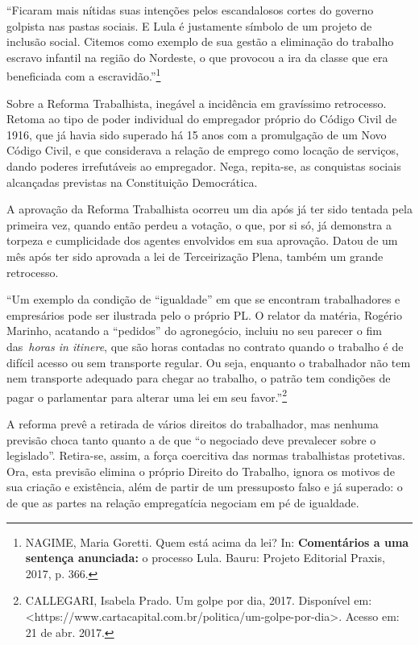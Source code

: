 ``Ficaram mais nítidas suas intenções pelos escandalosos cortes do
governo golpista nas pastas sociais. E Lula é justamente símbolo de um
projeto de inclusão social. Citemos como exemplo de sua gestão a
eliminação do trabalho escravo infantil na região do Nordeste, o que
provocou a ira da classe que era beneficiada com a
escravidão.''\footnote{NAGIME, Maria Goretti. Quem está acima da lei?
  In: \textbf{Comentários a uma sentença anunciada:} o processo Lula.
  Bauru: Projeto Editorial Praxis, 2017, p. 366.}

Sobre a Reforma Trabalhista, inegável a incidência em gravíssimo
retrocesso. Retoma ao tipo de poder individual do empregador próprio do
Código Civil de 1916, que já havia sido superado há 15 anos com a
promulgação de um Novo Código Civil, e que considerava a relação de
emprego como locação de serviços, dando poderes irrefutáveis ao
empregador. Nega, repita-se, as conquistas sociais alcançadas previstas
na Constituição Democrática.

A aprovação da Reforma Trabalhista ocorreu um dia após já ter sido
tentada pela primeira vez, quando então perdeu a votação, o que, por si
só, já demonstra a torpeza e cumplicidade dos agentes envolvidos em sua
aprovação. Datou de um mês após ter sido aprovada a lei de Terceirização
Plena, também um grande retrocesso.

``Um exemplo da condição de ``igualdade'' em que se encontram
trabalhadores e empresários pode ser ilustrada pelo o próprio PL. O
relator da matéria, Rogério Marinho, acatando a ``pedidos'' do
agronegócio, incluiu no seu parecer o fim das~\emph{horas in itinere},
que são horas contadas no contrato quando o trabalho é de difícil acesso
ou sem transporte regular. Ou seja, enquanto o trabalhador não tem nem
transporte adequado para chegar ao trabalho, o patrão tem condições de
pagar o parlamentar para alterar uma lei em seu favor.''\footnote{CALLEGARI,
  Isabela Prado. Um golpe por dia, 2017. Disponível
  em:\textless{}https://www.cartacapital.com.br/politica/um-golpe-por-dia\textgreater{}.
  Acesso em: 21 de abr. 2017.}

A reforma prevê a retirada de vários direitos do trabalhador, mas
nenhuma previsão choca tanto quanto a de que ``o negociado deve
prevalecer sobre o legislado''. Retira-se, assim, a força coercitiva das
normas trabalhistas protetivas. Ora, esta previsão elimina o próprio
Direito do Trabalho, ignora os motivos de sua criação e existência, além
de partir de um pressuposto falso e já superado: o de que as partes na
relação empregatícia negociam em pé de igualdade.

